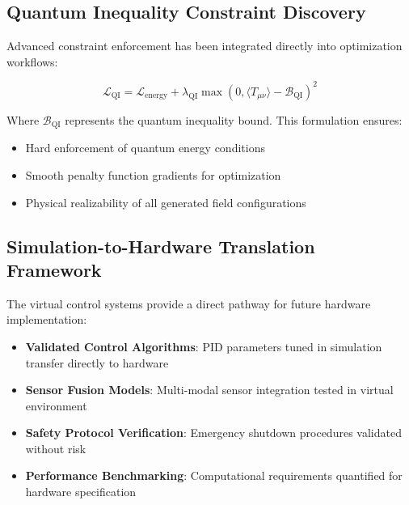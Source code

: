 \documentclass[11pt]{article}
\begin{document}
\subsection{Quantum Inequality Constraint Discovery}

Advanced constraint enforcement has been integrated directly into optimization workflows:

\begin{equation}
\mathcal{L}_{\text{QI}} = \mathcal{L}_{\text{energy}} + \lambda_{\text{QI}} \max(0, \langle T_{\mu\nu} \rangle - \mathcal{B}_{\text{QI}})^2
\end{equation}

Where $\mathcal{B}_{\text{QI}}$ represents the quantum inequality bound. This formulation ensures:
\begin{itemize}
\item Hard enforcement of quantum energy conditions
\item Smooth penalty function gradients for optimization
\item Physical realizability of all generated field configurations
\end{itemize}

\subsection{Simulation-to-Hardware Translation Framework}

The virtual control systems provide a direct pathway for future hardware implementation:

\begin{itemize}
\item \textbf{Validated Control Algorithms}: PID parameters tuned in simulation transfer directly to hardware
\item \textbf{Sensor Fusion Models}: Multi-modal sensor integration tested in virtual environment
\item \textbf{Safety Protocol Verification}: Emergency shutdown procedures validated without risk
\item \textbf{Performance Benchmarking}: Computational requirements quantified for hardware specification
\end{itemize}
\end{document}
